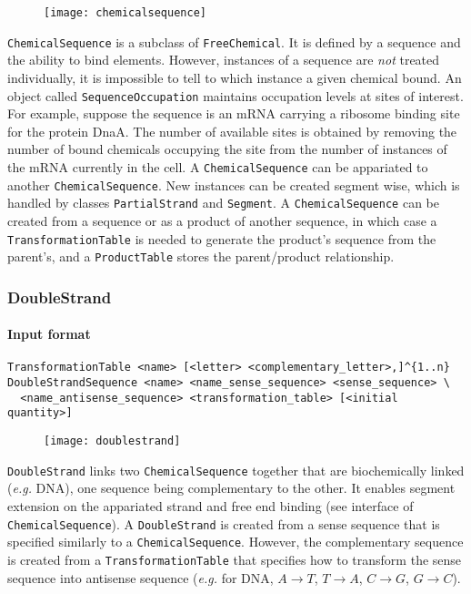 \begin{figure}[!ht]
	\centering
	\texttt{[image: chemicalsequence]}
\end{figure}

\texttt{ChemicalSequence} is a subclass of \texttt{FreeChemical}. It is defined by a sequence and the ability to bind elements. However, instances of a sequence are \emph{not} treated individually, it is impossible to tell to which instance a given chemical bound. An object called \texttt{SequenceOccupation} maintains occupation levels at sites of interest. For example, suppose the sequence is an mRNA carrying a ribosome binding site for the protein DnaA. The number of available sites is obtained by removing the number of bound chemicals occupying the site from the number of instances of the mRNA currently in the cell. A \texttt{ChemicalSequence} can be appariated to another \texttt{ChemicalSequence}. New instances can be created segment wise, which is handled by classes \texttt{PartialStrand} and \texttt{Segment}. A \texttt{ChemicalSequence} can be created from a sequence or as a product of another sequence, in which case a \texttt{TransformationTable} is needed to generate the product's sequence from the parent's, and a \texttt{ProductTable} stores the parent/product relationship.

\subsubsection{DoubleStrand}

\paragraph{Input format}
\begin{verbatim}
TransformationTable <name> [<letter> <complementary_letter>,]^{1..n}
DoubleStrandSequence <name> <name_sense_sequence> <sense_sequence> \
  <name_antisense_sequence> <transformation_table> [<initial quantity>]
\end{verbatim}

\begin{figure}[!ht]
	\centering
	\texttt{[image: doublestrand]}
\end{figure}

\texttt{DoubleStrand} links two \texttt{ChemicalSequence} together that are biochemically linked (\textit{e.g.} DNA), one sequence being complementary to the other. It enables segment extension on the appariated strand and free end binding (see interface of \texttt{ChemicalSequence}). A \texttt{DoubleStrand} is created from a sense sequence that is specified similarly to a \texttt{ChemicalSequence}. However, the complementary sequence is created from a \texttt{TransformationTable} that specifies how to transform the sense sequence into antisense sequence (\textit{e.g.} for DNA, $A\rightarrow T$, $T\rightarrow A$, $C\rightarrow G$, $G\rightarrow C$).

